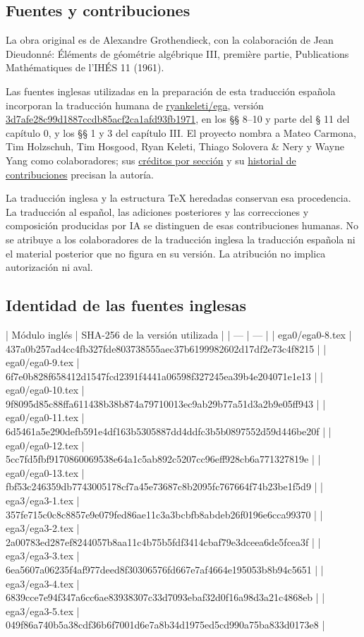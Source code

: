 \documentclass[10pt,oneside,openany]{book}
\theoremstyle{egaenv}\newtheorem*{env}{---}
\theoremstyle{egastatement}
\theoremstyle{egadescription}
\begin{document}
\subsection*{Fuentes y contribuciones}

La obra original es de Alexandre Grothendieck, con la colaboración de Jean Dieudonné: Éléments de géométrie algébrique III, première partie, Publications Mathématiques de l’IHÉS 11 (1961).

Las fuentes inglesas utilizadas en la preparación de esta traducción española incorporan la traducción humana de \href{https://github.com/ryankeleti/ega}{ryankeleti/ega}, versión \href{https://github.com/ryankeleti/ega/tree/3d7afe28c99d1887ccdb85acf2ca1afd93fb1971}{3d7afe28c99d1887ccdb85acf2ca1afd93fb1971}, en los §§ 8–10 y parte del § 11 del capítulo 0, y los §§ 1 y 3 del capítulo III. El proyecto nombra a Mateo Carmona, Tim Holzschuh, Tim Hosgood, Ryan Keleti, Thiago Solovera \& Nery y Wayne Yang como colaboradores; sus \href{https://github.com/ryankeleti/ega/blob/3d7afe28c99d1887ccdb85acf2ca1afd93fb1971/README.md}{créditos por sección} y su \href{https://github.com/ryankeleti/ega/commits/3d7afe28c99d1887ccdb85acf2ca1afd93fb1971}{historial de contribuciones} precisan la autoría.

La traducción inglesa y la estructura TeX heredadas conservan esa procedencia. La traducción al español, las adiciones posteriores y las correcciones y composición producidas por IA se distinguen de esas contribuciones humanas. No se atribuye a los colaboradores de la traducción inglesa la traducción española ni el material posterior que no figura en su versión. La atribución no implica autorización ni aval.

\subsection*{Identidad de las fuentes inglesas}

| Módulo inglés | SHA-256 de la versión utilizada |
| --- | --- |
| ega0/ega0-8.tex | 437a0b257ad4cc4fb327fde803738555aec37b6199982602d17df2e73c4f8215 |
| ega0/ega0-9.tex | 6f7e0b828f658412d1547fcd2391f4441a06598f327245ea39b4e204071e1e13 |
| ega0/ega0-10.tex | 9f8095d85c88ffa611438b38b874a79710013ec9ab29b77a51d3a2b9e05ff943 |
| ega0/ega0-11.tex | 6d5461a5e290defb591e4df163b5305887dd4ddfc3b5b0897552d59d446be20f |
| ega0/ega0-12.tex | 5cc7fd5fbf9170860069538e64a1c5ab892c5207cc96eff928cb6a771327819e |
| ega0/ega0-13.tex | fbf53c246359db7743005178cf7a45e73687c8b2095fc767664f74b23be1f5d9 |
| ega3/ega3-1.tex | 357fe715c0c8c8857e9e079fed86ae11c3a3bcbfb8abdeb26f0196e6cca99370 |
| ega3/ega3-2.tex | 2a00783ed287ef8244057b8aa11c4b75b5fdf3414cbaf79e3dceea6de5fcea3f |
| ega3/ega3-3.tex | 6ea5607a06235f4af977deed8f30306576fd667e7af4664e195053b8b94c5651 |
| ega3/ega3-4.tex | 6839cce7e94f347a6cc6ae83938307c33d7093ebaf32d0f16a98d3a21c4868eb |
| ega3/ega3-5.tex | 049f86a740b5a38cdf36b6f7001d6e7a8b34d1975ed5cd990a75ba833d0173e8 |
\end{document}
